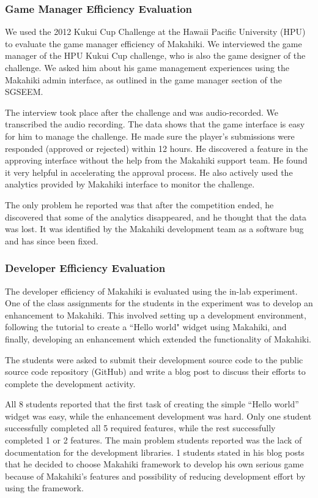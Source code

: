 \documentclass{sigchi}
\begin{document}
\subsubsection{Game Manager Efficiency Evaluation}

We used the 2012 Kukui Cup Challenge at the Hawaii Pacific University (HPU) to evaluate
the game manager efficiency of Makahiki. We interviewed the
game manager of the HPU Kukui Cup challenge, who is also the game designer of the challenge.
We asked him about his game management experiences using the Makahiki admin
interface, as outlined in the game manager section of the SGSEEM.

The interview took place after the challenge and was audio-recorded. We transcribed the audio recording. The data shows that the game interface is easy for him to manage the challenge. He made sure the player's submissions were responded (approved or rejected) within 12 hours. He discovered a feature in the approving interface without the help from the Makahiki support team. He found it very helpful in accelerating the approval process. He also actively used the analytics provided by Makahiki interface to monitor the challenge.

 The only problem he reported was that after the competition ended, he discovered that some of the analytics disappeared, and he thought that the data was lost. It was identified by the Makahiki development team as a software bug and has since been fixed.

\subsubsection{Developer Efficiency Evaluation}

The developer efficiency of Makahiki is evaluated using the in-lab experiment. One of the
class assignments for the students in the experiment was to develop an enhancement to Makahiki.
 This involved setting up a development environment, following the tutorial
to create a ``Hello world" widget using Makahiki, and finally,
developing an enhancement which extended the functionality of Makahiki.

The students were asked to submit their development source code to the
public source code repository (GitHub) and write a blog post to
discuss their efforts to complete the development activity.

All 8 students reported that the first task of creating the simple ``Hello world''
widget was easy, while the enhancement development was hard. Only one student
successfully completed all 5 required features, while the rest successfully completed
1 or 2 features. The main problem students reported was the lack of documentation for
the development libraries. 1 students stated in his blog posts that he decided to choose Makahiki framework to develop his own serious game because of Makahiki's features and possibility of reducing development effort by using the framework.
\end{document}

